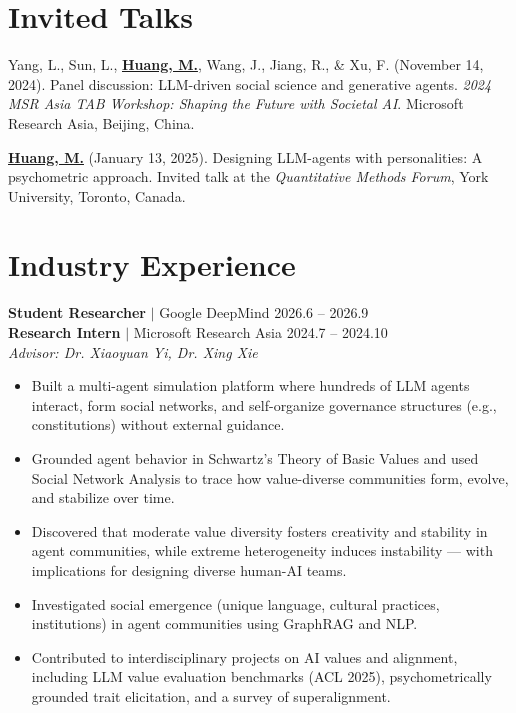 \documentclass[11pt,letterpaper]{article}
\newcommand{\myname}[1]{\textbf{\uline{#1}}}
\newcommand{\project}[1]{\textbf{\textcolor{black!80}{#1}}}
\newcommand{\advisor}[1]{\textit{Advisor: #1}}
\begin{document}
\section*{Invited Talks}

\begin{enumerate}[label={[\arabic*]}]
    \item Yang, L., Sun, L., \myname{Huang, M.}, Wang, J., Jiang, R., \& Xu, F. (November 14, 2024). Panel discussion: LLM-driven social science and generative agents. \textit{2024 MSR Asia TAB Workshop: Shaping the Future with Societal AI}. Microsoft Research Asia, Beijing, China.

    \item \myname{Huang, M.} (January 13, 2025). Designing LLM-agents with personalities: A psychometric approach. Invited talk at the \textit{Quantitative Methods Forum}, York University, Toronto, Canada.
\end{enumerate}

\section*{Industry Experience}

\noindent\textbf{Student Researcher} $|$ Google DeepMind \hfill 2026.6 -- 2026.9\\[0.3em]

\noindent\textbf{Research Intern} $|$ Microsoft Research Asia \hfill 2024.7 -- 2024.10\\
\noindent\advisor{Dr. Xiaoyuan Yi, Dr. Xing Xie}\\[0.3em]
\begin{itemize}
    \item Built a multi-agent simulation platform where hundreds of LLM agents interact, form social networks, and self-organize governance structures (e.g., constitutions) without external guidance.
    \item Grounded agent behavior in Schwartz's Theory of Basic Values and used Social Network Analysis to trace how value-diverse communities form, evolve, and stabilize over time.
    \item Discovered that moderate value diversity fosters creativity and stability in agent communities, while extreme heterogeneity induces instability --- with implications for designing diverse human-AI teams.
    \item Investigated social emergence (unique language, cultural practices, institutions) in agent communities using GraphRAG and NLP.
    \item Contributed to interdisciplinary projects on AI values and alignment, including LLM value evaluation benchmarks (ACL 2025), psychometrically grounded trait elicitation, and a survey of superalignment.
\end{itemize}
\end{document}
